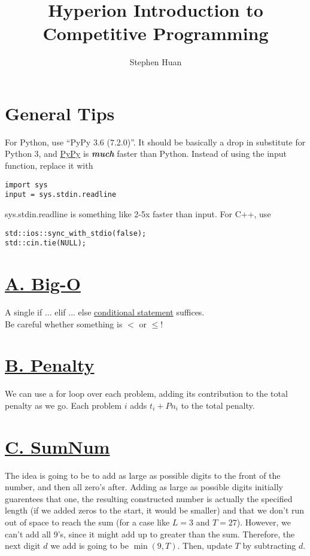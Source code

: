 \documentclass[11pt, oneside]{article}
\title{Hyperion Introduction to Competitive Programming}
\author{Stephen Huan}
\newcommand{\emphasis}[1]{\textbf{\textit{#1}}}
\begin{document}
\maketitle

\section{General Tips}

For Python, use ``PyPy 3.6 (7.2.0)''. It should be basically a drop in substitute for Python 3,
and \href{https://www.pypy.org/}{PyPy} is \emphasis{much} faster than Python.
Instead of using the input function, replace it with

\begin{verbatim}
import sys
input = sys.stdin.readline
\end{verbatim}

\noindent
sys.stdin.readline is something like 2-5x faster than input.
For C++, use
\begin{verbatim}
std::ios::sync_with_stdio(false);
std::cin.tie(NULL);
\end{verbatim}

\section{\href{https://codeforces.com/group/XaPbwwWypc/contest/275182/problem/A}{A. Big-O}}
A single if ... elif ... else \href{https://realpython.com/python-conditional-statements/}{conditional statement} suffices.
\\ Be careful whether something is \( < \) or \( \leq \)!

\section{\href{https://codeforces.com/group/XaPbwwWypc/contest/275182/problem/B}{B. Penalty}}
We can use a for loop over each problem, adding its contribution to the total penalty as we go.
Each problem \( i \) adds \( t_i + P n_i \) to the total penalty.

\section{\href{https://codeforces.com/group/XaPbwwWypc/contest/275182/problem/C}{C. SumNum}}
The idea is going to be to add as large as possible digits to the front of the number,
and then all zero's after. Adding as large as possible digits initially guarentees
that one, the resulting constructed number is actually the specified length
(if we added zeros to the start, it would be smaller) and that we don't run
out of space to reach the sum (for a case like \( L = 3 \) and \( T = 27 \)).
However, we can't add all 9's, since it might add up to greater than the sum.
Therefore, the next digit \( d \) we add is going to be \( \min(9, T) \).
Then, update \( T \) by subtracting \( d \).
\end{document}
